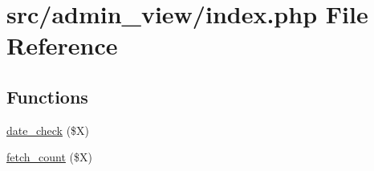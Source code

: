 \hypertarget{admin__view_2index_8php}{\section{src/admin\-\_\-view/index.php \-File \-Reference}
\label{admin__view_2index_8php}
}
\subsection*{\-Functions}
\begin{DoxyCompactItemize}
\item 
\hyperlink{admin__view_2index_8php_a00398fc736dcefa3b57280ce1cdbf438}{date\-\_\-check} (\$\-X)
\item 
\hyperlink{admin__view_2index_8php_ab37d59932fd6526f337d009f44f5ab2e}{fetch\-\_\-count} (\$\-X)
\end{DoxyCompactItemize}
